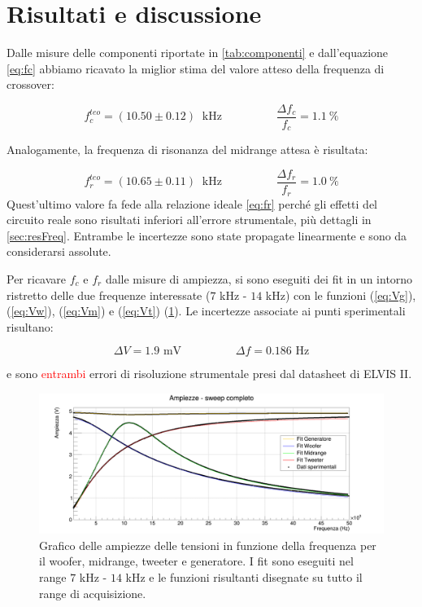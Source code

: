 \documentclass[12pt,italian]{article}
\newcommand{\err}[1]{\textcolor{red}{#1}}
\begin{document}
\section*{Risultati e discussione}
Dalle misure delle componenti riportate in \cref{tab:componenti} e
dall'equazione \eqref{eq:fc} abbiamo ricavato la miglior stima del valore
atteso della frequenza di crossover:

\begin{equation*}
	f_{c}^{teo} = (10.50 \pm 0.12)\  \text{ kHz} \hspace{2cm} \frac{\Delta f_{c}}{f_{c}} = 1.1 \ \%
\end{equation*}

\noindent
Analogamente, la frequenza di risonanza del midrange attesa è risultata:

\begin{equation*}
	f_{r}^{teo} = (10.65 \pm 0.11)\  \text{ kHz} \hspace{2cm} \frac{\Delta f_{r}}{f_{r}} = 1.0 \ \%
\end{equation*}
Quest'ultimo valore fa fede alla relazione ideale \eqref{eq:fr} perché gli effetti del circuito reale sono risultati inferiori
all'errore strumentale, più dettagli in \cref{sec:resFreq}. Entrambe le incertezze sono state propagate linearmente e sono da considerarsi assolute.

Per ricavare $f_{c}$ e $f_{r}$ dalle misure di ampiezza, si sono eseguiti dei
fit in un intorno ristretto delle due frequenze interessate ($ 7 $ kHz - $ 14 $
kHz) con le funzioni (\ref{eq:Vg}), (\ref{eq:Vw}), (\ref{eq:Vm}) e
(\ref{eq:Vt}) (\cref{fig:amp_sweep}). Le incertezze associate ai punti
sperimentali risultano:

\begin{equation*}
	\Delta V = 1.9 \text{ mV} \hspace{2cm} \Delta f = 0.186 \text{ Hz}
\end{equation*}

\noindent
e sono \err{entrambi} errori di risoluzione strumentale presi dal datasheet di ELVIS
II.

\begin{figure}[h]
	\centering
	\includegraphics[width=\textwidth]{fig_amp.png}
	\caption{Grafico delle ampiezze delle tensioni in funzione della frequenza per il woofer, midrange, tweeter e generatore. I fit sono eseguiti nel range $7$ kHz - $14$ kHz e le funzioni risultanti disegnate su tutto il range di acquisizione.}\label{fig:fc_fr}
	\label{fig:amp_sweep}
\end{figure}
\end{document}
